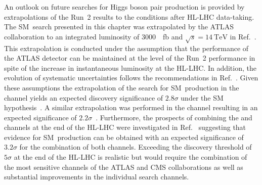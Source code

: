 An outlook on future searches for Higgs boson pair production is provided by
extrapolations of the Run~2 results to the conditions after HL-LHC
data-taking. The SM~\HH search presented in this chapter was extrapolated by the
ATLAS collaboration to an integrated luminosity of \SI{3000}{\per\femto\barn}
and $\sqrt{s} = \SI{14}{\TeV}$ in Ref.~\cite{ATL-PHYS-PUB-2021-044}. This
extrapolation is conducted under the assumption that the performance of the
ATLAS detector can be maintained at the level of the Run~2 performance in spite
of the increase in instantaneous luminosity at the HL-LHC. In addition, the
evolution of systematic uncertainties follows the recommendations in
Ref.~\cite{ATL-PHYS-PUB-2019-005}. Given these assumptions the extrapolation of
the search for SM~\HH production in the \bbtautau channel yields an expected
discovery significance of $2.8 \sigma$ under the SM
hypothesis~\cite{ATL-PHYS-PUB-2021-044}.
A similar extrapolation was performed in the \bbyy channel resulting in an
expected significance of $2.2 \sigma$~\cite{ATL-PHYS-PUB-2022-001}. Furthermore,
the prospects of combining the \bbtautau and \bbyy channels at the end of the
HL-LHC were investigated in Ref.~\cite{ATL-PHYS-PUB-2022-005} suggesting that
evidence for SM~\HH production can be obtained with an expected significance of
$3.2 \sigma$ for the combination of both channels. Exceeding the discovery
threshold of $5 \sigma$ at the end of the HL-LHC is realistic but would require
the combination of the most sensitive channels of the ATLAS and CMS
collaborations as well as substantial improvements in the individual search
channels.



